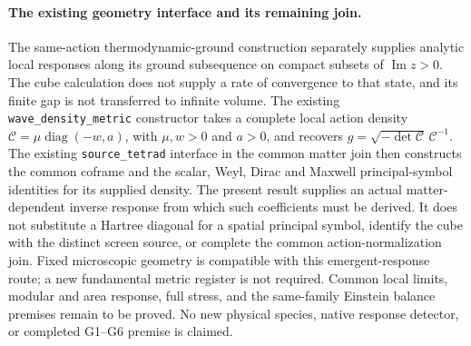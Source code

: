 \paragraph{The existing geometry interface and its remaining join.}
The same-action thermodynamic-ground construction separately supplies
analytic local responses along its ground subsequence on compact subsets
of $\operatorname{Im}z>0$.  The cube calculation does not supply a rate of
convergence to that state, and its finite gap is not transferred to infinite
volume.  The existing \texttt{wave\_density\_metric} constructor takes a
complete local action density $\mathcal C=\mu\operatorname{diag}(-w,a)$,
with $\mu,w>0$ and $a>0$, and recovers
$g=\sqrt{-\det\mathcal C}\,\mathcal C^{-1}$.
The existing \texttt{source\_tetrad} interface in the common matter join then
constructs the common coframe and the scalar, Weyl, Dirac and Maxwell
principal-symbol identities for its supplied density.
The present result supplies an actual matter-dependent inverse response
from which such coefficients must be derived.  It does not substitute a
Hartree diagonal for a spatial principal symbol, identify the cube with the
distinct screen source, or complete the common action-normalization join.
Fixed microscopic geometry is compatible with this emergent-response
route; a new fundamental metric register is not required.  Common local
limits, modular and area response, full stress, and the same-family
Einstein balance premises remain to be proved.  No new physical species,
native response detector, or completed G1--G6 premise is claimed.
